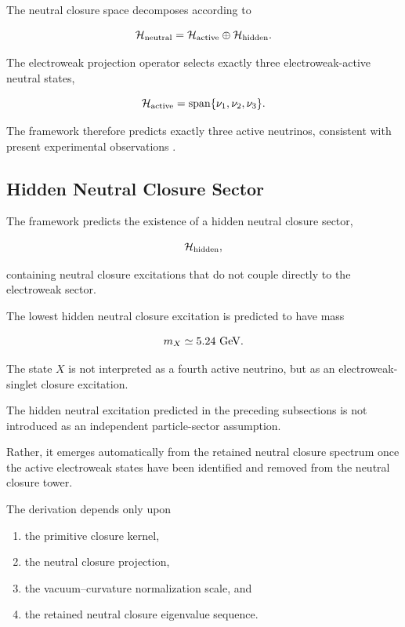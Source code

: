 \documentclass[11pt]{article}
\theoremstyle{definition}
\theoremstyle{remark}
\begin{document}
The neutral closure space decomposes according to

\begin{equation}
\mathcal H_{\rm neutral}
=
\mathcal H_{\rm active}
\oplus
\mathcal H_{\rm hidden}.
\end{equation}

The electroweak projection operator selects exactly three
electroweak-active neutral states,

\begin{equation}
\mathcal H_{\rm active}
=
\operatorname{span}
\{\nu_1,\nu_2,\nu_3\}.
\end{equation}

The framework therefore predicts exactly three active neutrinos,
consistent with present experimental observations
\cite{PDG2024}.


\subsection{Hidden Neutral Closure Sector}
\label{subsec:prediction_hidden_sector}

The framework predicts the existence of a hidden neutral
closure sector,

\begin{equation}
\mathcal H_{\rm hidden},
\end{equation}

containing neutral closure excitations that do not couple
directly to the electroweak sector.

The lowest hidden neutral closure excitation is predicted to
have mass

\begin{equation}
m_X
\simeq
5.24~{\rm GeV}.
\end{equation}

The state $X$ is not interpreted as a fourth active neutrino,
but as an electroweak-singlet closure excitation.

The hidden neutral excitation predicted in the preceding
subsections is not introduced as an independent particle-sector
assumption.

Rather, it emerges automatically from the retained neutral
closure spectrum once the active electroweak states have been
identified and removed from the neutral closure tower.

The derivation depends only upon

\begin{enumerate}
\item the primitive closure kernel,
\item the neutral closure projection,
\item the vacuum--curvature normalization scale, and
\item the retained neutral closure eigenvalue sequence.
\end{enumerate}
\end{document}
